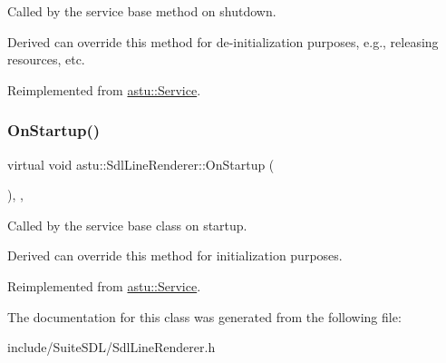 Called by the service base method on shutdown.

Derived can override this method for de-\/initialization purposes, e.\+g., releasing resources, etc. 

Reimplemented from \hyperlink{classastu_1_1Service_a1e1dff727df791c57fae782d8a613c5f}{astu\+::\+Service}.

\mbox{\label{classastu_1_1SdlLineRenderer_abe90e838b83f67c5e336d1b95cdea8a0}} 
\subsubsection{\texorpdfstring{On\+Startup()}{OnStartup()}}
{\footnotesize\ttfamily virtual void astu\+::\+Sdl\+Line\+Renderer\+::\+On\+Startup (\begin{DoxyParamCaption}{ }\end{DoxyParamCaption})\hspace{0.3cm}{\ttfamily [override]}, {\ttfamily [protected]}, {\ttfamily [virtual]}}

Called by the service base class on startup.

Derived can override this method for initialization purposes. 

Reimplemented from \hyperlink{classastu_1_1Service_a357dc663e000b1f086f681ec3c459bfe}{astu\+::\+Service}.



The documentation for this class was generated from the following file\+:\begin{DoxyCompactItemize}
\item 
include/\+Suite\+S\+D\+L/Sdl\+Line\+Renderer.\+h\end{DoxyCompactItemize}
